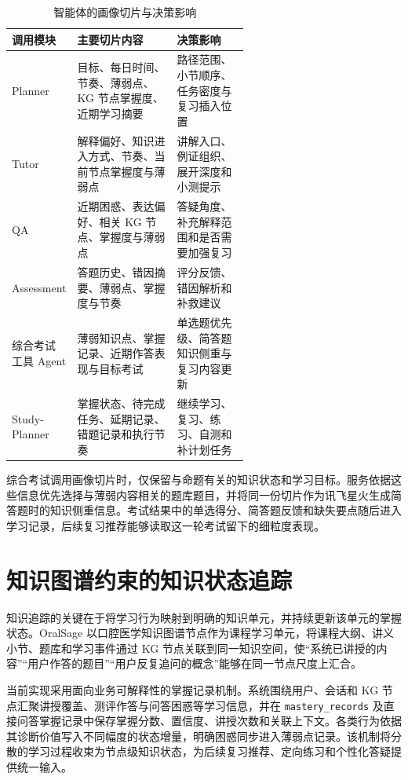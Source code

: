 \begin{table}[H]
  \centering
  \caption{智能体的画像切片与决策影响}
  \label{tab:profile-slices-agents}
  \begin{tabularx}{\linewidth}{p{0.18\linewidth}p{0.42\linewidth}X}
    \toprule
    调用模块 & 主要切片内容 & 决策影响 \\
    \midrule
    Planner & 目标、每日时间、节奏、薄弱点、KG 节点掌握度、近期学习摘要 & 路径范围、小节顺序、任务密度与复习插入位置 \\
    Tutor & 解释偏好、知识进入方式、节奏、当前节点掌握度与薄弱点 & 讲解入口、例证组织、展开深度和小测提示 \\
    QA & 近期困惑、表达偏好、相关 KG 节点、掌握度与薄弱点 & 答疑角度、补充解释范围和是否需要加强复习 \\
    Assessment & 答题历史、错因摘要、薄弱点、掌握度与节奏 & 评分反馈、错因解析和补救建议 \\
    综合考试工具 Agent & 薄弱知识点、掌握记录、近期作答表现与目标考试 & 单选题优先级、简答题知识侧重与复习内容更新 \\
    Study-Planner & 掌握状态、待完成任务、延期记录、错题记录和执行节奏 & 继续学习、复习、练习、自测和补计划任务 \\
    \bottomrule
  \end{tabularx}
\end{table}

综合考试调用画像切片时，仅保留与命题有关的知识状态和学习目标。服务依据这些信息优先选择与薄弱内容相关的题库题目，并将同一份切片作为讯飞星火生成简答题时的知识侧重信息。考试结果中的单选得分、简答题反馈和缺失要点随后进入学习记录，后续复习推荐能够读取这一轮考试留下的细粒度表现。

\section{知识图谱约束的知识状态追踪}

知识追踪的关键在于将学习行为映射到明确的知识单元，并持续更新该单元的掌握状态\cite{corbett1994knowledge,piech2015deep}。OralSage 以口腔医学知识图谱节点作为课程学习单元，将课程大纲、讲义小节、题库和学习事件通过 KG 节点关联到同一知识空间，使“系统已讲授的内容”“用户作答的题目”“用户反复追问的概念”能够在同一节点尺度上汇合。

当前实现采用面向业务可解释性的掌握记录机制。系统围绕用户、会话和 KG 节点汇聚讲授覆盖、测评作答与问答困惑等学习信息，并在 \texttt{mastery\_records} 及直接问答掌握记录中保存掌握分数、置信度、讲授次数和关联上下文。各类行为依据其诊断价值写入不同幅度的状态增量，明确困惑同步进入薄弱点记录。该机制将分散的学习过程收束为节点级知识状态，为后续复习推荐、定向练习和个性化答疑提供统一输入。

